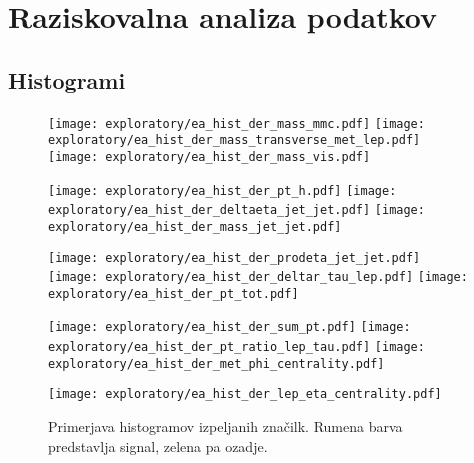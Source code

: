 \appendix
{}
\chapter{Raziskovalna analiza podatkov}
\label{ch:dodatek_raziskovalna}
\newpage
\section{Histogrami}

\begin{figure}[ht!]
	\label{hist_der}
	\texttt{[image: exploratory/ea\_hist\_der\_mass\_mmc.pdf]}
	\texttt{[image: exploratory/ea\_hist\_der\_mass\_transverse\_met\_lep.pdf]}
	\texttt{[image: exploratory/ea\_hist\_der\_mass\_vis.pdf]}
	
	\texttt{[image: exploratory/ea\_hist\_der\_pt\_h.pdf]}
	\texttt{[image: exploratory/ea\_hist\_der\_deltaeta\_jet\_jet.pdf]}
	\texttt{[image: exploratory/ea\_hist\_der\_mass\_jet\_jet.pdf]}
	
	\texttt{[image: exploratory/ea\_hist\_der\_prodeta\_jet\_jet.pdf]}
	\texttt{[image: exploratory/ea\_hist\_der\_deltar\_tau\_lep.pdf]}
	\texttt{[image: exploratory/ea\_hist\_der\_pt\_tot.pdf]}	
	
	\texttt{[image: exploratory/ea\_hist\_der\_sum\_pt.pdf]}
	\texttt{[image: exploratory/ea\_hist\_der\_pt\_ratio\_lep\_tau.pdf]}
	\texttt{[image: exploratory/ea\_hist\_der\_met\_phi\_centrality.pdf]}
	
	\texttt{[image: exploratory/ea\_hist\_der\_lep\_eta\_centrality.pdf]}
	
	\caption{Primerjava histogramov izpeljanih značilk. Rumena barva predstavlja signal, zelena pa ozadje.}
	\label{sl:histogram_izpeljane}
\end{figure}

